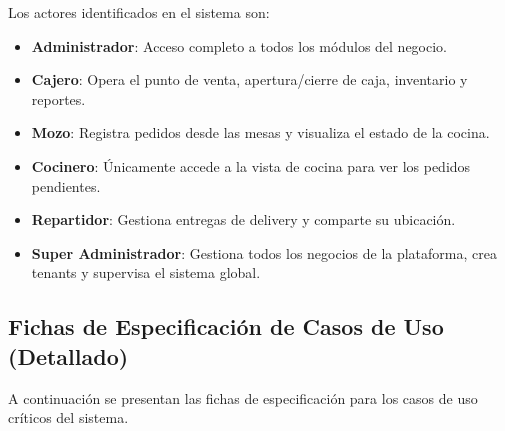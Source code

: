 \documentclass[12pt, a4paper]{article}
\begin{document}
Los actores identificados en el sistema son:

\begin{itemize}[leftmargin=2cm]
    \item \textbf{Administrador}: Acceso completo a todos los módulos del negocio.
    \item \textbf{Cajero}: Opera el punto de venta, apertura/cierre de caja, inventario y reportes.
    \item \textbf{Mozo}: Registra pedidos desde las mesas y visualiza el estado de la cocina.
    \item \textbf{Cocinero}: Únicamente accede a la vista de cocina para ver los pedidos pendientes.
    \item \textbf{Repartidor}: Gestiona entregas de delivery y comparte su ubicación.
    \item \textbf{Super Administrador}: Gestiona todos los negocios de la plataforma, crea tenants y supervisa el sistema global.
\end{itemize}

\subsection{Fichas de Especificación de Casos de Uso (Detallado)}

A continuación se presentan las fichas de especificación para los casos de uso críticos del sistema.
\end{document}
